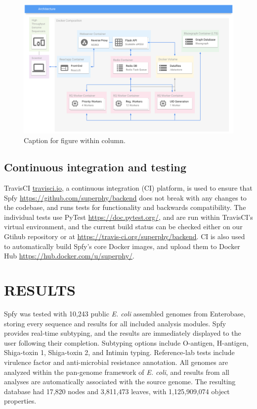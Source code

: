 \documentclass{article}
\begin{document}
\begin{figure}[t]
\begin{center}
\includegraphics[width=\textwidth]{images/docker}
\end{center}
\caption{Caption for figure within column.}
\label{fig-docker}
\end{figure}

\subsection{Continuous integration and testing}

TravisCI \url{travisci.io}, a continuous integration (CI) platform, is used to ensure that Spfy \url{https://github.com/superphy/backend} does not break with any changes to the codebase, and runs tests for functionality and backwards compatibility.
The individual tests use PyTest \url{https://doc.pytest.org/}, and are run within TravisCI's virtual environment, and the current build status can be checked either on our Gtihub repository or at \url{https://travis-ci.org/superphy/backend}.
CI is also used to automatically build Spfy's core Docker images, and upload them to Docker Hub \url{https://hub.docker.com/u/superphy/}.

\section{RESULTS}
Spfy was tested with 10,243 public \textit{E. coli} assembled genomes from Enterobase, storing every sequence and results for all included analysis modules.
Spfy provides real-time subtyping, and the results are immediately displayed to the user following their completion.
Subtyping options include O-antigen, H-antigen, Shiga-toxin 1, Shiga-toxin 2, and Intimin typing. Reference-lab tests include virulence factor and anti-microbial resistance annotation. All genomes are analyzed within the pan-genome framework of \textit{E. coli}, and results from all analyses are automatically associated with the source genome.
The resulting database had 17,820 nodes and 3,811,473 leaves, with 1,125,909,074 object properties. \par
\end{document}
